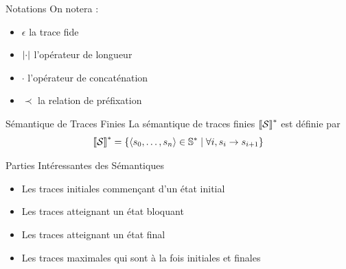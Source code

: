 \documentclass{cours}
\begin{document}
\begin{définition}{Notations}{}
On notera :
\begin{itemize}
	\item $\epsilon$ la trace fide
	\item $\left|\cdot\right|$ l'opérateur de longueur
	\item $\cdot$ l'opérateur de concaténation
	\item $\prec$ la relation de préfixation
\end{itemize}
\end{définition}

\begin{définition}{Sémantique de Traces Finies}{}
La sémantique de traces finies $\left\llbracket \mathcal{S} \right\rrbracket^{*}$ est définie par
\[
	\left\llbracket \mathcal{S} \right\rrbracket^{*} = \left\{\left\langle s_{0}, \ldots, s_{n} \right\rangle \in \mathbb{S}^{*} \mid \forall i, s_{i} \rightarrow s_{i + 1}\right\}
\]
\end{définition}

\begin{définition}{Parties Intéressantes des Sémantiques}{}
\begin{itemize}
	\item Les traces initiales commençant d'un état initial
	\item Les traces atteignant un état bloquant
	\item Les traces atteignant un état final
	\item Les traces maximales qui sont à la fois initiales et finales
\end{itemize}
\end{définition}
\end{document}
